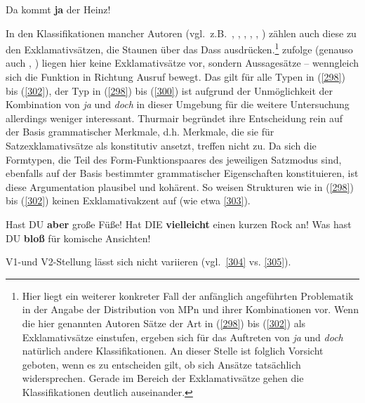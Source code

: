 \begin{exe}
	\ex\label{302} 
	Da kommt \textbf{ja} der Heinz!
	\hfill\hbox{\citet[107--108\slash 215]{Thurmair1989}}
\end{exe}
In den Klassifikationen mancher Autoren (vgl.\ z.B.\ \citealt[13]{Weydt1983b}, \citealt[157]{Hentschel1986}, \citealt[313]{Foolen1989}, \citealt[166--167]{Helbig1990}, \citealt[197]{Karagjosova2004}, \citealt[160--168]{Rinas2006}) zählen auch diese zu den Exklamativsätzen, die Staunen über das Dass ausdrücken.\footnote{Hier liegt ein weiterer konkreter Fall der anfänglich angeführten Problematik in der Angabe der Distribution von MPn und ihrer Kombinationen vor. Wenn die hier genannten Autoren Sätze der Art in (\ref{298}) bis (\ref{302}) als Exklamativsätze einstufen, ergeben sich für das Auftreten von \textit{ja} und \textit{doch} natürlich andere Klassifikationen. An dieser Stelle ist folglich Vorsicht geboten, wenn es zu entscheiden gilt, ob sich Ansätze tatsächlich widersprechen. Gerade im Bereich der Exklamativsätze gehen die Klassifikationen deutlich auseinander.} \citet[107--108]{Thurmair1989} zufolge (genauso auch \citealt[77--80]{Doherty1985}, \citealt[37]{Kwon2005}) liegen hier keine Exklamativsätze vor, sondern Aussagesätze – wenngleich sich die Funktion in Richtung Ausruf bewegt. Das gilt für alle Typen in (\ref{298}) bis (\ref{302}), der Typ in (\ref{298}) bis (\ref{300}) ist aufgrund der Unmöglichkeit der Kombination von \textit{ja} und \textit{doch} in dieser Umgebung für die weitere Untersuchung allerdings weniger interessant. Thurmair begründet ihre Entscheidung rein auf der Basis grammatischer Merkmale, d.h. Merkmale, die sie für Satzex\-klamativsätze als konstitutiv ansetzt, treffen nicht zu. Da sich die Formtypen, die Teil des Form-Funktionspaares des jeweiligen Satzmodus sind, ebenfalls auf der Basis bestimmter grammatischer Eigenschaften konstituieren, ist diese Argumentation plausibel und kohärent. So weisen Strukturen wie in (\ref{298}) bis (\ref{302}) keinen Exklamativakzent  auf (wie etwa \ref{303}).

\begin{exe}
	\ex\label{303} 
		\begin{xlist}	
			\ex\label{303a} Hast DU \textbf{aber} große Füße!
			\ex\label{303b} Hat DIE \textbf{vielleicht} einen kurzen Rock an!
			\ex\label{303c} Was hast DU \textbf{bloß} für komische Ansichten!
		\end{xlist}
\end{exe}	
V1-und V2-Stellung lässt sich nicht variieren (vgl.\ \ref{304} vs. \ref{305}).

